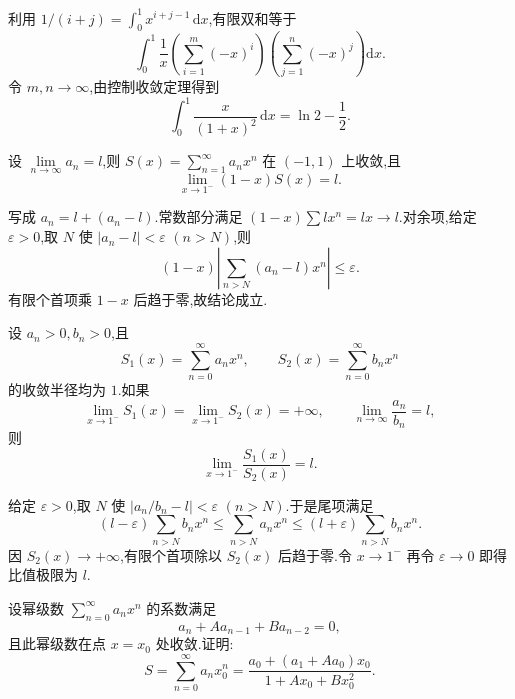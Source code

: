 \begin{solution}
    利用 $1/(i+j)=\int_0^1x^{i+j-1}\,\mathrm{d}x$,有限双和等于
    \[
        \int_0^1\dfrac{1}{x}
        \left(\sum\limits_{i=1}^m(-x)^i\right)
        \left(\sum\limits_{j=1}^n(-x)^j\right)\mathrm{d}x.
    \]
    令 $m,n\to\infty$,由控制收敛定理得到
    \[
        \int_0^1\dfrac{x}{(1+x)^2}\,\mathrm{d}x=\ln2-\dfrac{1}{2}.
    \]
\end{solution}

\begin{example}
    设 $\displaystyle\lim\limits_{n\to\infty}a_n=l$,则 $\displaystyle S(x)=\sum\limits_{n=1}^{\infty}a_nx^n$ 在 $(-1,1)$ 上收敛,且
    \[
        \lim\limits_{x\to1^-}(1-x)S(x)=l.
    \]
\end{example}
\exampleblank

\begin{solution}
    写成 $a_n=l+(a_n-l)$.常数部分满足
    $(1-x)\sum lx^n=lx\to l$.对余项,给定 $\varepsilon>0$,取 $N$ 使
    $|a_n-l|<\varepsilon$ $(n>N)$,则
    \[
        (1-x)\left|\sum\limits_{n>N}(a_n-l)x^n\right|\leq\varepsilon.
    \]
    有限个首项乘 $1-x$ 后趋于零,故结论成立.
\end{solution}

\begin{example}
    设 $a_n>0,b_n>0$,且
    \[
        S_1(x)=\sum\limits_{n=0}^{\infty}a_nx^n,
        \qquad
        S_2(x)=\sum\limits_{n=0}^{\infty}b_nx^n
    \]
    的收敛半径均为 $1$.如果
    \[
        \lim\limits_{x\to1^-}S_1(x)=\lim\limits_{x\to1^-}S_2(x)=+\infty,
        \qquad
        \lim\limits_{n\to\infty}\dfrac{a_n}{b_n}=l,
    \]
    则
    \[
        \lim\limits_{x\to1^-}\dfrac{S_1(x)}{S_2(x)}=l.
    \]
\end{example}
\exampleblank

\begin{solution}
    给定 $\varepsilon>0$,取 $N$ 使 $|a_n/b_n-l|<\varepsilon$ $(n>N)$.于是尾项满足
    \[
        (l-\varepsilon)\sum_{n>N}b_nx^n
        \leq\sum_{n>N}a_nx^n
        \leq(l+\varepsilon)\sum_{n>N}b_nx^n.
    \]
    因 $S_2(x)\to+\infty$,有限个首项除以 $S_2(x)$ 后趋于零.令 $x\to1^-$ 再令 $\varepsilon\to0$ 即得比值极限为 $l$.
\end{solution}

\begin{example}[\markstar]
    设幂级数 $\displaystyle\sum\limits_{n=0}^{\infty}a_nx^n$ 的系数满足
    \[
        a_n+Aa_{n-1}+Ba_{n-2}=0,
    \]
    且此幂级数在点 $x=x_0$ 处收敛.证明:
    \[
        S=\sum\limits_{n=0}^{\infty}a_nx_0^n
        =\dfrac{a_0+(a_1+Aa_0)x_0}{1+Ax_0+Bx_0^2}.
    \]
\end{example}
\exampleblank

